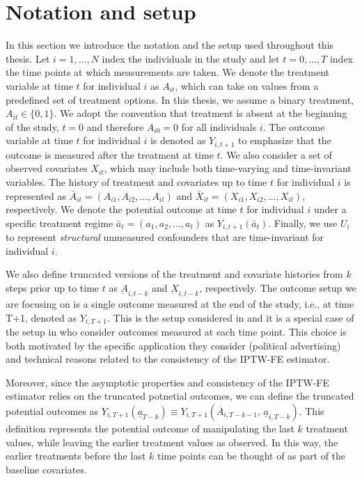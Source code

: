 \chapter{Notation and setup}
In this section we introduce the notation and the setup used throughout this thesis. 
Let $i=1, \ldots, N$ index the individuals in the study and let $t=0, \ldots, T$ 
index the time points at which measurements are taken. We denote the treatment 
variable at time $t$ for individual $i$ as $A_{it}$, which can take on values from a 
predefined set of treatment options. In this thesis, 
we assume a binary treatment, $A_{it} \in \{0,1\}$. We adopt the convention that treatment 
is absent at the beginning of the study, $t=0$ and therefore $A_{i0} = 0$ 
for all individuals $i$. 
The outcome variable at 
time $t$ for individual $i$ is 
denoted as $Y_{i,t+1}$ to emphasize that the outcome is measured after the treatment at time $t$.
We also consider a set of observed covariates $X_{it}$, 
which may include both time-varying 
and time-invariant variables. The history of treatment and covariates up to time $t$ for 
individual $i$ is represented as
$\bar{A}_{it} = (A_{i1}, A_{i2}, \ldots, A_{it})$ and $\bar{X}_{it} = (X_{i1}, X_{i2}, \ldots, X_{it})$, 
respectively. We denote the potential outcome at time $t$ for individual $i$ under a specific treatment
regime $\bar{a}_t = (a_1, a_2, \ldots, a_t)$ as $Y_{i,t+1}(\bar{a}_t)$. Finally, we use $U_i$ 
to represent \emph{structural} unmeasured confounders that are time-invariant for individual $i$. 

We also define truncated versions of the treatment and covariate histories from \(k\) 
steps prior up to time \(t\) as \(\underbar{A}_{i,t-k}\) and \(\underbar{X}_{i,t-k}\), respectively. 
The outcome setup we are focusing on is a single outcome measured at the end of 
the study, i.e., at time T+1, denoted as $Y_{i,T+1}$. This is the setup considered in
\cite{blackwellEffectPoliticalAdvertising2024} and it is a special case of the setup in
\cite{hattSequentialDeconfoundingCausal2024} who consider outcomes measured at each time point. This 
choice is both motivated by the specific application they consider 
(political advertising) and technical reasons related to the consistency of the IPTW-FE estimator.

Moreover, since the asymptotic properties and consistency of the IPTW-FE estimator relies on the 
truncated potnetial outcomes, we can define the truncated potential outcomes as
$Y_{i,T+1}(\underline{a}_{T-k}) \equiv Y_{i,T+1}(\overline{A}_{i,T-k-1},\, \underline{a}_{i,T-k})$. This 
definition represents the potential outcome of manipulating 
the last $k$ treatment values, while leaving the earlier treatment values as observed. In this way, 
the earlier treatments before the last $k$ time points can be thought of as part of the baseline covariates. 